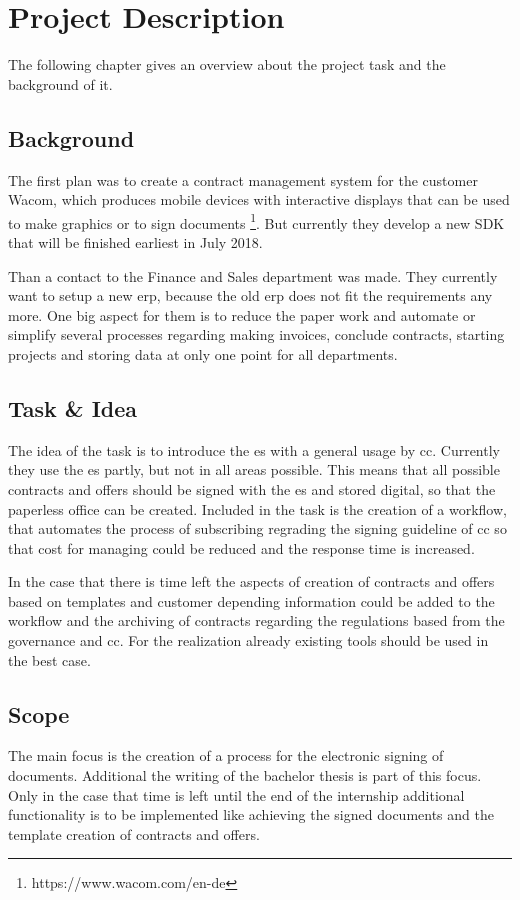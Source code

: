 \chapter{Project Description}
The following chapter gives an overview about the project task and the background of it.

\section{Background}
The first plan was to create a contract management system for the customer Wacom, which produces mobile devices with interactive displays that can be used to make graphics or to sign documents \footnote{https://www.wacom.com/en-de}. But currently they develop a new \gls{SDK} that will be finished earliest in July 2018.

Than a contact to the Finance and Sales department was made. They currently want to setup a new \gls{erp}, because the old \gls{erp} does not fit the requirements any more. One big aspect for them is to reduce the paper work and automate or simplify several processes regarding making invoices, conclude contracts, starting projects and storing data at only one point for all departments.

\section{Task \& Idea}
The idea of the task is to introduce the \gls{es} with a general usage by \gls{cc}. Currently they use the \gls{es} partly, but not in all areas possible.
This means that all possible contracts and offers should be signed with the \gls{es} and stored digital, so that the paperless office can be created. Included in the task is the creation of a workflow, that automates the process of subscribing regrading the signing guideline of \gls{cc} so that cost for managing could be reduced and the response time is increased.

In the case that there is time left the aspects of creation of contracts and offers based on templates and customer depending information could be added to the workflow and the archiving of contracts regarding the regulations based from the governance and \gls{cc}. For the realization already existing tools should be used in the best case.

\section{Scope}
 The main focus is the creation of a process for the electronic signing of documents. Additional the writing of the bachelor thesis is part of this focus. Only in the case that time is left until the end of the internship additional functionality is to be implemented like achieving the signed documents and the template creation of contracts and offers.

